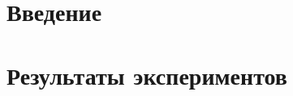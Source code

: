 \documentclass{article}
\title{\VAR{ title }}
\date{\today}
\begin{document}
\maketitle

\section{Введение}

\section{Результаты экспериментов}
\end{document}
